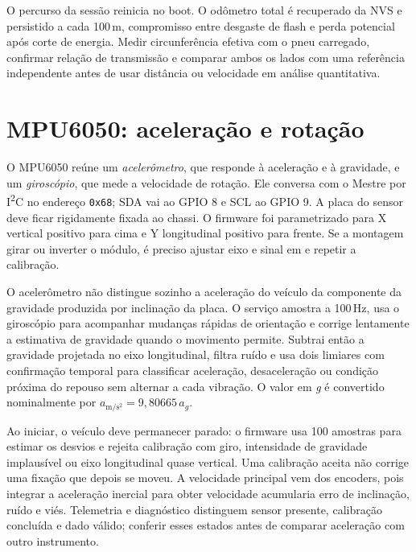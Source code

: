 O percurso da sessão reinicia no boot. O odômetro total é recuperado da NVS e persistido a cada 100\,m, compromisso entre desgaste de flash e perda potencial após corte de energia. Medir circunferência efetiva com o pneu carregado, confirmar relação de transmissão e comparar ambos os lados com uma referência independente antes de usar distância ou velocidade em análise quantitativa.

\section{MPU6050: aceleração e rotação}
O MPU6050 reúne um \emph{acelerômetro}, que responde à aceleração e à gravidade, e um \emph{giroscópio}, que mede a velocidade de rotação. Ele conversa com o Mestre por I\textsuperscript{2}C no endereço \texttt{0x68}; SDA vai ao GPIO 8 e SCL ao GPIO 9. A placa do sensor deve ficar rigidamente fixada ao chassi. O firmware foi parametrizado para X vertical positivo para cima e Y longitudinal positivo para frente. Se a montagem girar ou inverter o módulo, é preciso ajustar eixo e sinal em  e repetir a calibração.

O acelerômetro não distingue sozinho a aceleração do veículo da componente da gravidade produzida por inclinação da placa. O serviço amostra a 100\,Hz, usa o giroscópio para acompanhar mudanças rápidas de orientação e corrige lentamente a estimativa de gravidade quando o movimento permite. Subtrai então a gravidade projetada no eixo longitudinal, filtra ruído e usa dois limiares com confirmação temporal para classificar aceleração, desaceleração ou condição próxima do repouso sem alternar a cada vibração. O valor em \emph{g} é convertido nominalmente por $a_{\mathrm{m/s^2}}=9{,}80665\,a_g$.

Ao iniciar, o veículo deve permanecer parado: o firmware usa 100 amostras para estimar os desvios e rejeita calibração com giro, intensidade de gravidade implausível ou eixo longitudinal quase vertical. Uma calibração aceita não corrige uma fixação que depois se moveu. A velocidade principal vem dos encoders, pois integrar a aceleração inercial para obter velocidade acumularia erro de inclinação, ruído e viés. Telemetria e diagnóstico distinguem sensor presente, calibração concluída e dado válido; conferir esses estados antes de comparar aceleração com outro instrumento.

